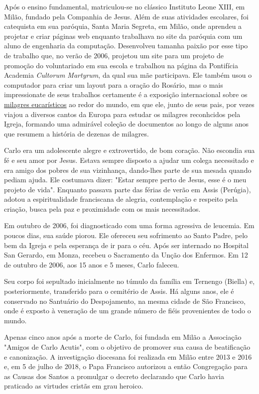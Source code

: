 \documentclass[a4paper,14pt]{extarticle} \usepackage[utf8]{inputenc}
\begin{document}
Após o ensino fundamental, matriculou-se no clássico Instituto Leone XIII, em Milão, fundado pela Companhia de Jesus. Além de suas atividades escolares, foi catequista em sua paróquia, Santa Maria Segreta, em Milão, onde aprendeu a projetar e criar páginas web enquanto trabalhava no site da paróquia com um aluno de engenharia da computação. Desenvolveu tamanha paixão por esse tipo de trabalho que, no verão de 2006, projetou um site para um projeto de promoção do voluntariado em sua escola e trabalhou na página da Pontifícia Academia \textit{Cultorum Martyrum}, da qual sua mãe participava. Ele também usou o computador para criar um layout para a oração do Rosário, mas o mais impressionate de seus trabalhos certamente é a exposição internacional sobre os \href{https://www.miracolieucaristici.org/pr/Liste/list.html}{\color{blue}\underline{milagres eucarísticos}} ao redor do mundo, em que ele, junto de seus pais, por vezes viajou a diversos cantos da Europa para estudar os milagres reconhcidos pela Igreja, formando uma admirável coleção de documentos ao longo de alguns anos que resumem a história de dezenas de milagres.

Carlo era um adolescente alegre e extrovertido, de bom coração. Não escondia sua fé e seu amor por Jesus. Estava sempre disposto a ajudar um colega necessitado e era amigo dos pobres de sua vizinhança, dando-lhes parte de sua mesada quando pediam ajuda. Ele costumava dizer: "Estar sempre perto de Jesus, esse é o meu projeto de vida". Enquanto passava parte das férias de verão em Assis (Perúgia), adotou a espiritualidade franciscana de alegria, contemplação e respeito pela criação, busca pela paz e proximidade com os mais necessitados.

Em outubro de 2006, foi diagnosticado com uma forma agressiva de leucemia. Em poucos dias, sua saúde piorou. Ele ofereceu seu sofrimento ao Santo Padre, pelo bem da Igreja e pela esperança de ir para o céu. Após ser internado no Hospital San Gerardo, em Monza, recebeu o Sacramento da Unção dos Enfermos. Em 12 de outubro de 2006, aos 15 anos e 5 meses, Carlo faleceu.

Seu corpo foi sepultado inicialmente no túmulo da família em Ternengo (Biella) e, posteriormente, transferido para o cemitério de Assis. Há alguns anos, ele é conservado no Santuário do Despojamento, na mesma cidade de São Francisco, onde é exposto à veneração de um grande número de fiéis provenientes de todo o mundo.

Apenas cinco anos após a morte de Carlo, foi fundada em Milão a Associação "Amigos de Carlo Acutis", com o objetivo de promover sua causa de beatificação e canonização. A investigação diocesana foi realizada em Milão entre 2013 e 2016 e, em 5 de julho de 2018, o Papa Francisco autorizou a então Congregação para as Causas dos Santos a promulgar o decreto declarando que Carlo havia praticado as virtudes cristãs em grau heroico.
\end{document}
